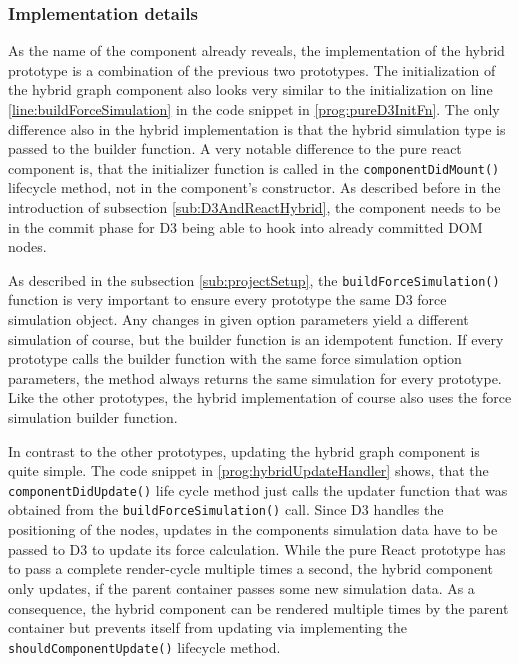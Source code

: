 \subsubsection{Implementation details}

As the name of the component already reveals, the implementation of the hybrid prototype is a combination of the previous two prototypes. The initialization of the hybrid graph component also looks very similar to the initialization on line \ref{line:buildForceSimulation} in the code snippet in \ref{prog:pureD3InitFn}. The only difference also in the hybrid implementation is that the hybrid simulation type is passed to the builder function. A very notable difference to the pure react component is, that the initializer function is called in the \texttt{componentDidMount()} lifecycle method, not in the component's constructor. As described before in the introduction of subsection \ref{sub:D3AndReactHybrid}, the component needs to be in the commit phase for D3 being able to hook into already committed DOM nodes.

As described in the subsection \ref{sub:projectSetup}, the \texttt{buildForceSimulation()} function is very important to ensure every prototype the same D3 force simulation object. Any changes in given option parameters yield a different simulation of course, but the builder function is an idempotent function. If every prototype calls the builder function with the same force simulation option parameters, the method always returns the same simulation for every prototype. Like the other prototypes, the hybrid implementation of course also uses the force simulation builder function.

In contrast to the other prototypes, updating the hybrid graph component is quite simple. The code snippet in \ref{prog:hybridUpdateHandler} shows, that the \texttt{componentDidUpdate()} life cycle method just calls the updater function that was obtained from the \texttt{buildForceSimulation()} call. Since D3 handles the positioning of the nodes, updates in the components simulation data have to be passed to D3 to update its force calculation. While the pure React prototype has to pass a complete render-cycle multiple times a second, the hybrid component only updates, if the parent container passes some new simulation data. As a consequence, the hybrid component can be rendered multiple times by the parent container but prevents itself from updating via implementing the \texttt{shouldComponentUpdate()} lifecycle method.

